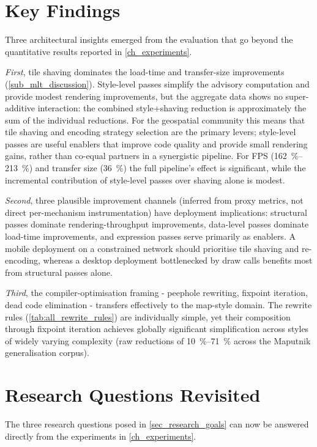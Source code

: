 \section{Key Findings}

Three architectural insights emerged from the evaluation that go beyond the quantitative results reported in \cref{ch_experiments}.

\emph{First}, tile shaving dominates the load-time and transfer-size improvements (\cref{sub_mlt_discussion}).
Style-level passes simplify the advisory computation and provide modest rendering improvements, but the aggregate data shows no super-additive interaction: the combined style+shaving reduction is approximately the sum of the individual reductions.
For the geospatial community this means that tile shaving and encoding strategy selection are the primary levers; style-level passes are useful enablers that improve code quality and provide small rendering gains, rather than co-equal partners in a synergistic pipeline.
For FPS (\qtyrange{162}{213}{\percent}) and transfer size (\qty{36}{\percent}) the full pipeline's effect is significant, while the incremental contribution of style-level passes over shaving alone is modest.

\emph{Second}, three plausible improvement channels (inferred from proxy metrics, not direct per-mechanism instrumentation) have deployment implications: structural passes dominate rendering-throughput improvements, data-level passes dominate load-time improvements, and expression passes serve primarily as enablers.
A mobile deployment on a constrained network should prioritise tile shaving and re-encoding, whereas a desktop deployment bottlenecked by draw calls benefits most from structural passes alone.

\emph{Third}, the compiler-optimisation framing - peephole rewriting, fixpoint iteration, dead code elimination - transfers effectively to the map-style domain.
The rewrite rules (\cref{tab:all_rewrite_rules}) are individually simple, yet their composition through fixpoint iteration achieves globally significant simplification across styles of widely varying complexity (raw reductions of \qtyrange{10}{71}{\percent} across the Maputnik generalisation corpus).

\section{Research Questions Revisited}\label{sec_rq_revisited}

The three research questions posed in \cref{sec_research_goals} can now be answered directly from the experiments in \cref{ch_experiments}.

